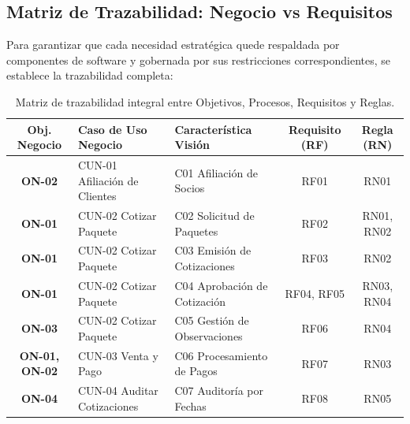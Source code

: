 \subsection{Matriz de Trazabilidad: Negocio vs Requisitos} 
Para garantizar que cada necesidad estratégica quede respaldada por componentes de software y gobernada por sus restricciones correspondientes, se establece la trazabilidad completa:

\begin{table}[H]
\centering
\footnotesize
\begin{tabularx}{\textwidth}{cLLcc}
\toprule
\textbf{Obj. Negocio} & \textbf{Caso de Uso Negocio} & \textbf{Característica Visión} & \textbf{Requisito (RF)} & \textbf{Regla (RN)} \\
\midrule
\textbf{ON-02} & CUN-01 Afiliación de Clientes & C01 Afiliación de Socios & RF01 & RN01 \\ \midrule
\textbf{ON-01} & CUN-02 Cotizar Paquete & C02 Solicitud de Paquetes & RF02 & RN01, RN02 \\ \midrule
\textbf{ON-01} & CUN-02 Cotizar Paquete & C03 Emisión de Cotizaciones & RF03 & RN02 \\ \midrule
\textbf{ON-01} & CUN-02 Cotizar Paquete & C04 Aprobación de Cotización & RF04, RF05 & RN03, RN04 \\ \midrule
\textbf{ON-03} & CUN-02 Cotizar Paquete & C05 Gestión de Observaciones & RF06 & RN04 \\ \midrule
\textbf{ON-01, ON-02} & CUN-03 Venta y Pago & C06 Procesamiento de Pagos & RF07 & RN03 \\ \midrule
\textbf{ON-04} & CUN-04 Auditar Cotizaciones & C07 Auditoría por Fechas & RF08 & RN05 \\ \bottomrule
\end{tabularx}
\caption{Matriz de trazabilidad integral entre Objetivos, Procesos, Requisitos y Reglas.}\label{tab:trazabilidad}
\end{table}
